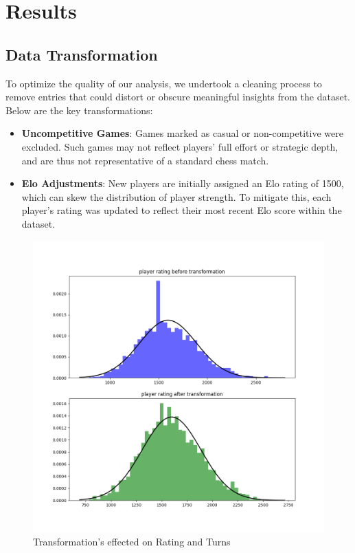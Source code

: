 \documentclass[conference]{IEEEtran}
\begin{document}
\section{Results}
\subsection{Data Transformation}

To optimize the quality of our analysis, we undertook a cleaning process to remove entries that could distort or obscure meaningful insights from the dataset. Below are the key transformations:

\begin{itemize}
    \item \textbf{Uncompetitive Games}: Games marked as casual or non-competitive were excluded. Such games may not reflect players' full effort or strategic depth, and are thus not representative of a standard chess match.   
 
    \item \textbf{Elo Adjustments}: New players are initially assigned an Elo rating of 1500, which can skew the distribution of player strength. To mitigate this, each player's rating was updated to reflect their most recent Elo score within the dataset.
\end{itemize}

\begin{figure}[H]
    \centering
    \includegraphics[width=0.8\linewidth]{transformation_plot.png}
    \caption{Transformation's effected on Rating and Turns}
    \label{fig:transformation_plot}
\end{figure}
\end{document}
